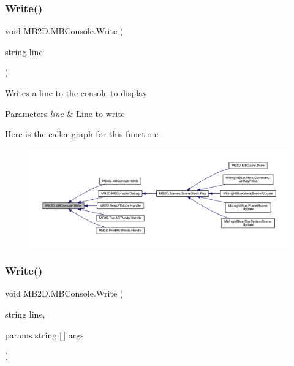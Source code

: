 \subsubsection{\texorpdfstring{Write()}{Write()}\hspace{0.1cm}{\footnotesize\ttfamily [1/3]}}
{\footnotesize\ttfamily void M\+B2\+D.\+M\+B\+Console.\+Write (\begin{DoxyParamCaption}\item[{string}]{line }\end{DoxyParamCaption})\hspace{0.3cm}{\ttfamily [inline]}}



Writes a line to the console to display 


\begin{DoxyParams}{Parameters}
{\em line} & Line to write\\
\hline
\end{DoxyParams}
Here is the caller graph for this function\+:\nopagebreak
\begin{figure}[H]
\begin{center}
\leavevmode
\includegraphics[width=350pt]{class_m_b2_d_1_1_m_b_console_a1d85081cb5400f09883c1fc62f37d861_icgraph}
\end{center}
\end{figure}
\hypertarget{class_m_b2_d_1_1_m_b_console_a77bc48284eeebbc13eeced6451513c09}{}\label{class_m_b2_d_1_1_m_b_console_a77bc48284eeebbc13eeced6451513c09} 
\subsubsection{\texorpdfstring{Write()}{Write()}\hspace{0.1cm}{\footnotesize\ttfamily [2/3]}}
{\footnotesize\ttfamily void M\+B2\+D.\+M\+B\+Console.\+Write (\begin{DoxyParamCaption}\item[{string}]{line,  }\item[{params string \mbox{[}$\,$\mbox{]}}]{args }\end{DoxyParamCaption})\hspace{0.3cm}{\ttfamily [inline]}}



